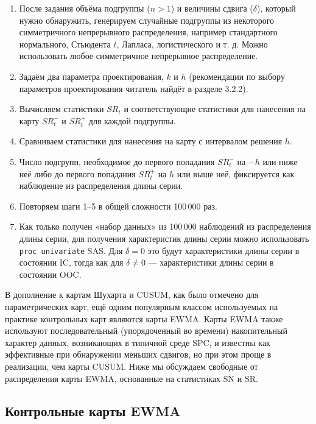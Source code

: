 \begin{enumerate}
	\item[\textbf{Шаг 1:}] После задания объёма подгруппы (\(n > 1\)) и величины сдвига (\(\delta\)), который нужно обнаружить, генерируем случайные подгруппы из некоторого симметричного непрерывного распределения, например стандартного нормального, Стьюдента \(t\), Лапласа, логистического и т. д. Можно использовать любое симметричное непрерывное распределение.
	\item[\textbf{Шаг 2:}] Задаём два параметра проектирования, \(k\) и \(h\) (рекомендации по выбору параметров проектирования читатель найдёт в разделе 3.2.2).
	\item[\textbf{Шаг 3:}] Вычисляем статистики \(SR_t\) и соответствующие статистики для нанесения на карту \(SR_t^-\) и \(SR_t^+\) для каждой подгруппы.
	\item[\textbf{Шаг 4:}] Сравниваем статистики для нанесения на карту с интервалом решения \(h\).
	\item[\textbf{Шаг 5:}] Число подгрупп, необходимое до первого попадания \(SR_t^-\) на \(-h\) или ниже неё либо до первого попадания \(SR_t^+\) на \(h\) или выше неё, фиксируется как наблюдение из распределения длины серии.
	\item[\textbf{Шаг 6:}] Повторяем шаги 1--5 в общей сложности 100\,000 раз.
	\item[\textbf{Шаг 7:}] Как только получен «набор данных» из 100\,000 наблюдений из распределения длины серии, для получения характеристик длины серии можно использовать \texttt{proc univariate} SAS. Для \(\delta = 0\) это будут характеристики длины серии в состоянии IC, тогда как для \(\delta \ne 0\) --- характеристики длины серии в состоянии OOC.
\end{enumerate}

В дополнение к картам Шухарта и CUSUM, как было отмечено для параметрических карт, ещё одним популярным классом используемых на практике контрольных карт являются карты EWMA. Карты EWMA также используют последовательный (упорядоченный во времени) накопительный характер данных, возникающих в типичной среде SPC, и известны как эффективные при обнаружении меньших сдвигов, но при этом проще в реализации, чем карты CUSUM. Ниже мы обсуждаем свободные от распределения карты EWMA, основанные на статистиках SN и SR.

\subsection{Контрольные карты EWMA}
